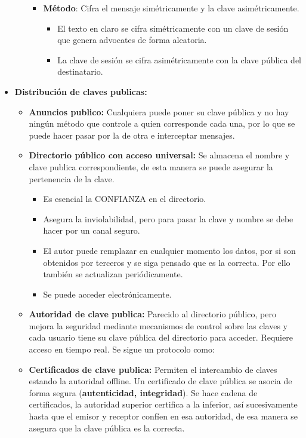 \documentclass[12pt, twoside, openright]{report} %
\begin{document}
\begin{itemize}
\begin{itemize}
\begin{itemize}
\begin{itemize}
			                  \end{itemize}
			            \item \textbf{Método}: Cifra el mensaje simétricamente y la clave asimétricamente.
			                  \begin{itemize}
				                  \item El texto en claro se cifra simétricamente con un clave de sesión que genera advocates de forma aleatoria.
				                  \item La clave de sesión se cifra asimétricamente con la clave pública del destinatario.
			                  \end{itemize}
		            \end{itemize}
	      \end{itemize}
	\item \textbf{Distribución de claves publicas:}
	      \begin{itemize}
		      \item \textbf{Anuncios publico:} Cualquiera puede poner su clave pública y no hay ningún método que controle a quien corresponde cada una, por lo que se puede hacer pasar por la de otra e interceptar mensajes.
		      \item \textbf{Directorio público con acceso universal:} Se almacena el nombre y clave publica correspondiente, de esta manera se puede asegurar la pertenencia de la clave.
		            \begin{itemize}
			            \item Es esencial la CONFIANZA en el directorio.
			            \item Asegura la inviolabilidad, pero para pasar la clave y nombre se debe hacer por un canal seguro.
			            \item El autor puede remplazar en cualquier momento los datos, por si son obtenidos por terceros y se siga pensado que es la correcta. Por ello también se actualizan periódicamente.
			            \item Se puede acceder electrónicamente.
		            \end{itemize}
		      \item \textbf{Autoridad de clave publica:} Parecido al directorio público, pero mejora la seguridad mediante mecanismos de control sobre las claves y cada usuario tiene su clave pública del directorio para acceder. Requiere acceso en tiempo real. Se sigue un protocolo como:
		      \item \textbf{Certificados de clave publica:} Permiten el intercambio de claves estando la autoridad offline. Un certificado de clave pública se asocia de forma segura (\textbf{autenticidad, integridad}). Se hace cadena de certificados, la autoridad superior certifica a la inferior, así sucesivamente hasta que el emisor y receptor confíen en esa autoridad, de esa manera se asegura que la clave pública es la correcta.

\end{itemize}
\end{itemize}
\end{document}
